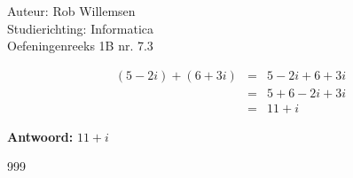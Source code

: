 \documentclass[a4paper]{article}
\begin{document}
\noindent \large Auteur: Rob Willemsen \\
\noindent \large Studierichting: Informatica\\
\noindent \large Oefeningenreeks 1B nr. 7.3\\

\medskip

\normalsize

\begin{eqnarray*}
  (5-2i)+(6+3i) & = & 5-2i+6+3i \\
                & = & 5+6-2i+3i \\
                & = & 11+i
\end{eqnarray*}

\textbf{Antwoord:} $11+i$

\begin{thebibliography}{999}
\end{thebibliography}
\end{document}
